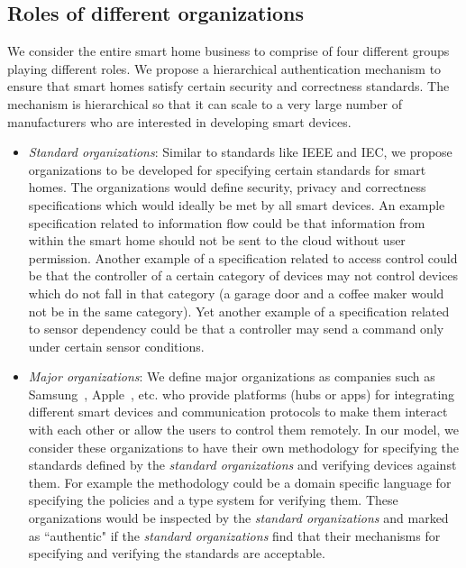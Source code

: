 \documentclass{article}
\begin{document}
\subsection{Roles of different organizations}
\label{subsec:roles}
We consider the entire smart home business to comprise of four different groups playing different roles. We propose a hierarchical authentication mechanism to ensure that smart homes satisfy certain security and correctness standards. The  mechanism is hierarchical so that it can scale to a very large number of manufacturers who are interested in developing smart devices.   
\begin{itemize}[topsep=0pt,itemsep=0ex,partopsep=1ex,parsep=1ex]
\item \textit{Standard organizations}: Similar to standards like IEEE and IEC, we propose organizations to be developed for specifying certain standards for smart homes. The organizations would define security, privacy and correctness specifications which would ideally be met by all smart devices. An example specification related to information flow could be that information from within the smart home should not be sent to the cloud without user permission. Another example of a specification related to access control could be that the controller of a certain category of devices may not control devices which do not fall in that category (a garage door and a coffee maker would not be in the same category). Yet another example of a specification related to sensor dependency could be that a controller may send a command only under certain sensor conditions.
\item \textit{Major organizations}: We define major organizations as companies such as Samsung~\cite{samsung}, Apple~\cite{homekit}, etc. who provide platforms (hubs or apps) for integrating different smart devices and communication protocols to make them interact with each other or allow the users to control them remotely. In our model, we consider these organizations to have their own methodology for specifying the standards defined by the \textit{standard organizations} and verifying devices against them. For example the methodology could be a domain specific language for specifying the policies and a type system for verifying them.
These organizations would be inspected by the \textit{standard organizations} and marked as ``authentic" if the \textit{standard organizations} find that their mechanisms for specifying and verifying the standards are acceptable.



\end{itemize}
\end{document}
